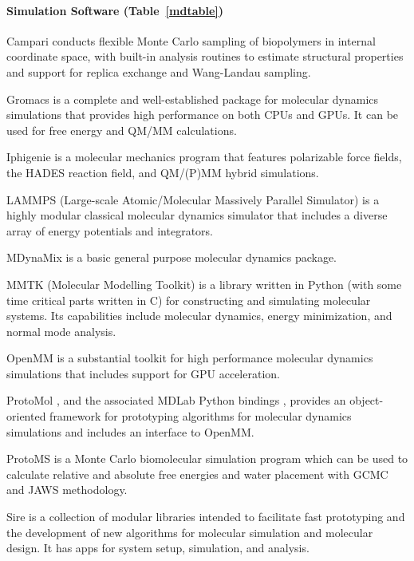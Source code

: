 \paragraph{Simulation Software (Table~\ref{mdtable})}

Campari \cite{Vitalis_2009} conducts flexible Monte Carlo sampling of biopolymers in internal coordinate space, with built-in analysis routines to estimate structural properties and support for replica exchange and Wang-Landau sampling.

Gromacs \cite{Pronk_2013} is a complete and well-established package for molecular dynamics simulations that provides high performance on both CPUs and GPUs.  It can be used for free energy and QM/MM calculations.

Iphigenie \cite{Lorenzen_2012} is a molecular mechanics program that features polarizable force fields, the HADES reaction field, and QM/(P)MM hybrid simulations.

LAMMPS  (Large-scale Atomic/Molecular Massively Parallel Simulator) \cite{Plimpton_1995} is a highly modular classical molecular dynamics simulator that includes a diverse array of energy potentials and integrators.

MDynaMix \cite{Lyubartsev_2000} is a basic general purpose molecular dynamics package.

MMTK (Molecular Modelling Toolkit) \cite{Hinsen_2000} is a library written in Python (with some time critical parts written in C) for constructing and simulating molecular systems.  Its capabilities include molecular dynamics, energy minimization, and normal mode analysis.

OpenMM  \cite{Eastman_2013} is a substantial toolkit for high performance molecular dynamics simulations that includes support for GPU acceleration.

ProtoMol \cite{Matthey_2004}, and the associated MDLab Python bindings \cite{Cickovski_2009}, provides an object-oriented framework for prototyping algorithms for molecular dynamics simulations and includes an interface to OpenMM.

ProtoMS \cite{Michel_2006} is a Monte Carlo biomolecular simulation program which can be used to calculate relative and absolute free energies and water placement with GCMC and JAWS methodology.

Sire is a collection of modular libraries intended to facilitate fast prototyping and the development of new algorithms for molecular simulation and molecular design. It has apps for system setup, simulation, and analysis.

